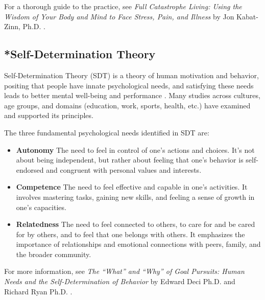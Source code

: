 \documentclass[12pt,letterpaper]{article}
\begin{document}
For a thorough guide to the practice, see \textit{Full Catastrophe Living: Using the Wisdom of Your Body and Mind to Face Stress, Pain, and Illness} by Jon Kabat-Zinn, Ph.D. \cite{kabat-zinnMBSR}.
\subsection{*Self-Determination Theory}
\label{sec:sdt}
Self-Determination Theory (SDT) is a theory of human motivation and behavior, positing that people have innate psychological needs, and satisfying these needs leads to better mental well-being and performance \cite{deciSDT}. Many studies across cultures, age groups, and domains (education, work, sports, health, etc.) have examined and supported its principles.

The three fundamental psychological needs identified in SDT are:
\begin{itemize}
    \item \textbf{Autonomy} The need to feel in control of one's actions and choices. It's not about being independent, but rather about feeling that one's behavior is self-endorsed and congruent with personal values and interests.
    \item \textbf{Competence} The need to feel effective and capable in one's activities. It involves mastering tasks, gaining new skills, and feeling a sense of growth in one's capacities.
    \item \textbf{Relatedness} The need to feel connected to others, to care for and be cared for by others, and to feel that one belongs with others. It emphasizes the importance of relationships and emotional connections with peers, family, and the broader community.
\end{itemize}
For more information, see \textit{The “What” and “Why” of Goal Pursuits: Human Needs and the Self-Determination of Behavior} by Edward Deci Ph.D. and Richard Ryan Ph.D. \cite{deciSDT}.
\end{document}
